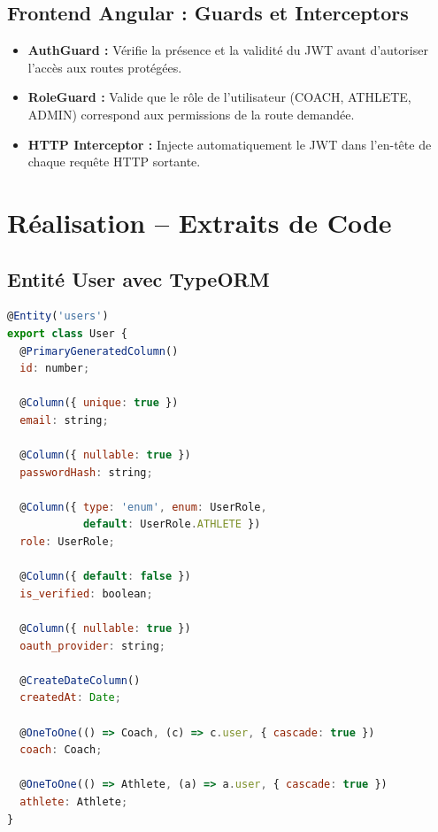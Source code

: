 \subsection{Frontend Angular : Guards et Interceptors}
\begin{itemize}
    \item \textbf{AuthGuard :} Vérifie la présence et la validité du JWT avant d'autoriser l'accès aux routes protégées.
    \item \textbf{RoleGuard :} Valide que le rôle de l'utilisateur (COACH, ATHLETE, ADMIN) correspond aux permissions de la route demandée.
    \item \textbf{HTTP Interceptor :} Injecte automatiquement le JWT dans l'en-tête de chaque requête HTTP sortante.
\end{itemize}

\section{Réalisation -- Extraits de Code}

\subsection{Entité User avec TypeORM}
\begin{lstlisting}[language=JavaScript, caption=Entité User.ts (TypeORM)]
@Entity('users')
export class User {
  @PrimaryGeneratedColumn()
  id: number;

  @Column({ unique: true })
  email: string;

  @Column({ nullable: true })
  passwordHash: string;

  @Column({ type: 'enum', enum: UserRole,
            default: UserRole.ATHLETE })
  role: UserRole;

  @Column({ default: false })
  is_verified: boolean;

  @Column({ nullable: true })
  oauth_provider: string;

  @CreateDateColumn()
  createdAt: Date;

  @OneToOne(() => Coach, (c) => c.user, { cascade: true })
  coach: Coach;

  @OneToOne(() => Athlete, (a) => a.user, { cascade: true })
  athlete: Athlete;
}
\end{lstlisting}

